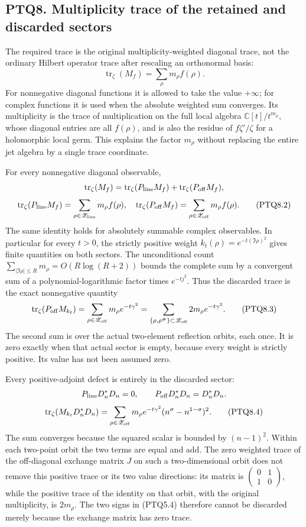 \subsection{PTQ8. Multiplicity trace of the retained and discarded
sectors}\label{ptq8.-multiplicity-trace-of-the-retained-and-discarded-sectors}

The required trace is the original multiplicity-weighted diagonal trace,
not the ordinary Hilbert operator trace after rescaling an orthonormal
basis: \[
\operatorname{tr}_\zeta(M_f)=\sum_\rho m_\rho f(\rho).
\tag{PTQ8.1}
\] For nonnegative diagonal functions it is allowed to take the value
\(+\infty\); for complex functions it is used when the absolute weighted
sum converges. Its multiplicity is the trace of multiplication on the
full local algebra \(\mathbb C[t]/t^{m_\rho}\), whose diagonal entries
are all \(f(\rho)\), and is also the residue of \(f\zeta'/\zeta\) for a
holomorphic local germ. This explains the factor \(m_\rho\) without
replacing the entire jet algebra by a single trace coordinate.

For every nonnegative diagonal observable, \[
\operatorname{tr}_\zeta(M_f)
=\operatorname{tr}_\zeta(P_{\rm line}M_f)
+\operatorname{tr}_\zeta(P_{\rm off}M_f),
\] \[
\operatorname{tr}_\zeta(P_{\rm line}M_f)=
\sum_{\rho\in\mathscr Z_{\rm line}}m_\rho f(\rho),
\quad
\operatorname{tr}_\zeta(P_{\rm off}M_f)=
\sum_{\rho\in\mathscr Z_{\rm off}}m_\rho f(\rho).
\tag{PTQ8.2}
\] The same identity holds for absolutely summable complex observables.
In particular for every \(t>0\), the strictly positive weight
\(k_t(\rho)=e^{-t(\Im\rho)^2}\) gives finite quantities on both sectors.
The unconditional count \(\sum_{|\Im\rho|\le R}m_\rho=O(R\log(R+2))\)
bounds the complete sum by a convergent sum of a polynomial-logarithmic
factor times \(e^{-tj^2}\). Thus the discarded trace is the exact
nonnegative quantity \[
\operatorname{tr}_\zeta(P_{\rm off}M_{k_t})
=\sum_{\rho\in\mathscr Z_{\rm off}}m_\rho e^{-t\gamma^2}
=\sum_{\{\rho,\rho^\#\}\subset\mathscr Z_{\rm off}}
2m_\rho e^{-t\gamma^2}.
\tag{PTQ8.3}
\] The second sum is over the actual two-element reflection orbits, each
once. It is zero exactly when that actual sector is empty, because every
weight is strictly positive. Its value has not been assumed zero.

Every positive-adjoint defect is entirely in the discarded sector: \[
P_{\rm line}D_n^*D_n=0,
\qquad P_{\rm off}D_n^*D_n=D_n^*D_n.
\] \[
\operatorname{tr}_\zeta(M_{k_t}D_n^*D_n)
=\sum_{\rho\in\mathscr Z_{\rm off}}
m_\rho e^{-t\gamma^2}(n^\sigma-n^{1-\sigma})^2.
\tag{PTQ8.4}
\] The sum converges because the squared scalar is bounded by
\((n-1)^2\). Within each two-point orbit the two terms are equal and
add. The zero weighted trace of the off-diagonal exchange matrix \(J\)
on such a two-dimensional orbit does not remove this positive trace or
its two value directions: its matrix is
\(\begin{pmatrix}0&1\\1&0\end{pmatrix}\), while the positive trace of
the identity on that orbit, with the original multiplicity, is
\(2m_\rho\). The two signs in (PTQ5.4) therefore cannot be discarded
merely because the exchange matrix has zero trace.


